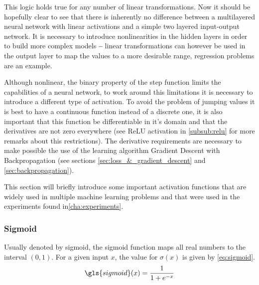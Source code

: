 This logic holds true for any number of linear transformations. Now it should be hopefully clear to see that there is inherently no difference between a multilayered neural network with linear activations and a simple two layered input-output network. It is necessary to introduce nonlinearities in the hidden layers in order to build more complex models \textbf{--} linear transformations can however be used in the output layer to map the values to a more desirable range, regression problems are an example.

Although nonlinear, the binary property of the step function limits the capabilities of a neural network, to work around this limitations it is necessary to introduce a different type of activation. To avoid the problem of jumping values it is best to have a continuous function instead of a discrete one, it is also important that this function be differentiable in it's domain and that the derivatives are not zero everywhere (see  \gls{ReLU} activation in \autoref{subsub:relu} for more remarks about this restrictions). The derivative requirements are necessary to make possible the use of the learning algorithm Gradient Descent with Backpropagation (see sections \ref{sec:loss_&_gradient_descent} and \ref{sec:backpropagation}).

This section will briefly introduce some important activation functions that are widely used in multiple machine learning problems and that were used in the experiments found in\autoref{cha:experiments}.

\subsubsection{Sigmoid} \label{subsub:sigmoid}
Usually denoted by \gls{sigmoid}, the sigmoid function maps all real numbers to the interval $(0, 1)$. For a given input $x$, the value for $\sigma(x)$ is given by \autoref{eq:sigmoid}.
\begin{equation} \label{eq:sigmoid}
    \gls{sigmoid}(x) = \frac{1}{1 + e ^ {-x}}
\end{equation}

